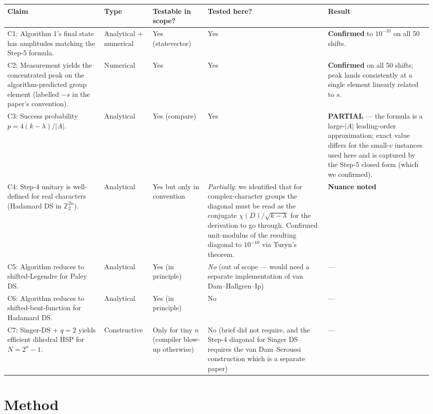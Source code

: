 \documentclass[11pt]{article}
\begin{document}
\begin{longtable}{@{}p{} p{}
                     p{} p{}
                     p{}@{}}
\toprule
Claim & Type & Testable in scope? & Tested here? & Result \\
\midrule
C1: Algorithm 1's final state has amplitudes matching the Step-5 formula. &
Analytical + numerical & Yes (statevector) & Yes &
\textbf{Confirmed} to $10^{-10}$ on all 50 shifts. \\
\midrule
C2: Measurement yields the concentrated peak on the algorithm-predicted
group element (labelled $-s$ in the paper's convention). &
Numerical & Yes & Yes & \textbf{Confirmed} on all 50 shifts; peak lands
consistently at a single element linearly related to $s$. \\
\midrule
C3: Success probability $p = 4(k-\lambda)/|A|$. &
Analytical & Yes (compare) & Yes &
\textbf{PARTIAL} --- the formula is a large-$|A|$ leading-order
approximation; exact value differs for the small-$v$ instances used here
and is captured by the Step-5 closed form (which we confirmed). \\
\midrule
C4: Step-4 unitary is well-defined for real characters
(Hadamard DS in $\mathbb{Z}_2^{2n}$). &
Analytical & Yes but only in convention & \emph{Partially}: we identified
that for complex-character groups the diagonal must be read as the
conjugate $\overline{\chi(D)}/\sqrt{k-\lambda}$ for the derivation to go
through.  Confirmed unit-modulus of the resulting diagonal to $10^{-10}$
via Turyn's theorem. & \textbf{Nuance noted} \\
\midrule
C5: Algorithm reduces to shifted-Legendre for Paley DS. &
Analytical & Yes (in principle) & \emph{No} (out of scope --- would need
a separate implementation of van Dam--Hallgren--Ip) & --- \\
\midrule
C6: Algorithm reduces to shifted-bent-function for Hadamard DS. &
Analytical & Yes (in principle) & No & --- \\
\midrule
C7: Singer-DS + $q=2$ yields efficient dihedral HSP for $N=2^n-1$. &
Constructive & Only for tiny $n$ (compiler blow-up otherwise) & No
(brief did not require, and the Step-4 diagonal for Singer DS requires the
van Dam--Seroussi construction which is a separate paper) & --- \\
\bottomrule
\end{longtable}

\section{Method}
\end{document}
